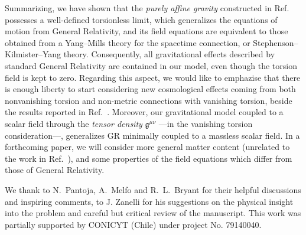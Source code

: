 \documentclass[aps,prl,twocolumn,superscriptaddress,showpacs,showkeys]{revtex4-1}
\begin{document}
Summarizing, we have shown that the  \emph{purely affine gravity} constructed in Ref.~\cite{Skirzewski:2014eta} possesses a well-defined torsionless limit, which generalizes the equations of motion  from General Relativity, and its field equations are equivalent to those obtained from a Yang--Mills theory for the spacetime connection, or Stephenson--Kilmister--Yang theory. Consequently, all gravitational effects described by standard General Relativity are contained in our model, even though the torsion field is kept to zero. Regarding this aspect, we would like to emphazise that there is enough liberty to start considering new cosmological effects coming from both nonvanishing torsion and non-metric connections with vanishing torsion, beside the results reported in Ref.~\cite{Chen:2013kia,Chen:2013ota}.
Moreover, our gravitational model coupled to a scalar field through the \emph{tensor density} $\mathfrak{g}^{\mu\nu}$ ---in the vanishing torsion consideration---, generalizes GR minimally coupled to a massless scalar field. In a forthcoming paper, we will consider more general matter content (unrelated to the work in Ref.~\cite{Cook:2008mx}), and some properties of the field equations which differ from those of General Relativity.

\begin{acknowledgments}
  We thank to N.~Pantoja, A.~Melfo and R.~L.~Bryant for their helpful discussions and inspiring comments, to J. Zanelli for his suggestions on the physical insight into the problem and careful but critical review of the manuscript.
  This work was partially supported by CONICYT (Chile) under project No. 79140040.
\end{acknowledgments}



\end{document}

